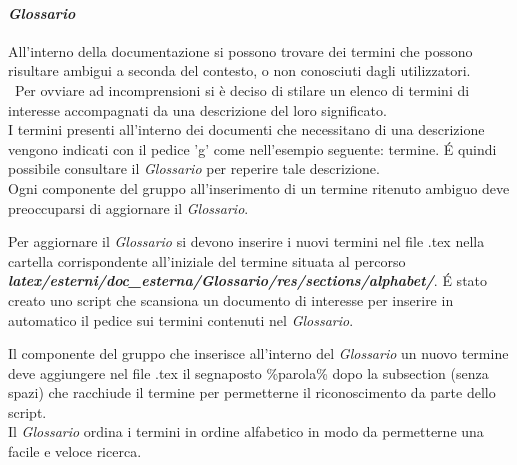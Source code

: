 \paragraph{\textit{Glossario}}
All'interno della documentazione si possono trovare dei termini che possono risultare ambigui a seconda del contesto, o non conosciuti dagli utilizzatori.\\\
Per ovviare ad incomprensioni si è deciso di stilare un elenco di termini di interesse accompagnati da una descrizione del loro significato.\\
I termini presenti all'interno dei documenti che necessitano di una descrizione vengono indicati con il pedice 'g' come nell'esempio seguente: termine.
É quindi possibile consultare il \textit{Glossario} per reperire tale descrizione.
\\
Ogni componente del gruppo all'inserimento di un termine ritenuto ambiguo deve preoccuparsi di aggiornare il \textit{Glossario}.

Per aggiornare il \textit{Glossario} si devono inserire i nuovi termini nel file .tex nella cartella corrispondente all'iniziale del termine situata al percorso
\textbf{\textit{latex/esterni/doc\_esterna/Glossario/res/sections/alphabet/}}.
É stato creato uno script che scansiona un documento di interesse per inserire in automatico il pedice sui termini contenuti nel \textit{Glossario}.

Il componente del gruppo che inserisce all'interno del \textit{Glossario} un nuovo termine deve aggiungere nel file .tex il segnaposto \%parola\% dopo la subsection (senza spazi) che racchiude il termine per permetterne il riconoscimento da parte dello script.
\\
Il \textit{Glossario} ordina i termini in ordine alfabetico in modo da permetterne una facile e veloce ricerca.